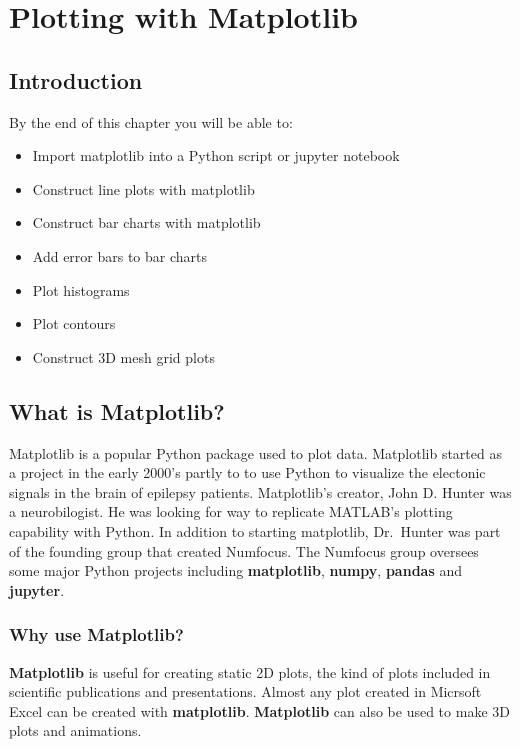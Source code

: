 \documentclass{book}
\begin{document}
    \chapter{Plotting with Matplotlib}\label{plotting-with-matplotlib}

    \section{Introduction}\label{introduction}

    By the end of this chapter you will be able to:

\begin{itemize}
\item
  Import matplotlib into a Python script or jupyter notebook
\item
  Construct line plots with matplotlib
\item
  Construct bar charts with matplotlib
\item
  Add error bars to bar charts
\item
  Plot histograms
\item
  Plot contours
\item
  Construct 3D mesh grid plots
\end{itemize}

    \section{What is Matplotlib?}\label{what-is-matplotlib}

    Matplotlib is a popular Python package used to plot data. Matplotlib
started as a project in the early 2000's partly to to use Python to
visualize the electonic signals in the brain of epilepsy patients.
Matplotlib's creator, John D. Hunter was a neurobilogist. He was looking
for way to replicate MATLAB's plotting capability with Python. In
addition to starting matplotlib, Dr.~Hunter was part of the founding
group that created Numfocus. The Numfocus group oversees some major
Python projects including \textbf{matplotlib}, \textbf{numpy},
\textbf{pandas} and \textbf{jupyter}.

    \subsection{Why use Matplotlib?}\label{why-use-matplotlib}

    \textbf{Matplotlib} is useful for creating static 2D plots, the kind of
plots included in scientific publications and presentations. Almost any
plot created in Micrsoft Excel can be created with \textbf{matplotlib}.
\textbf{Matplotlib} can also be used to make 3D plots and animations.
\end{document}
